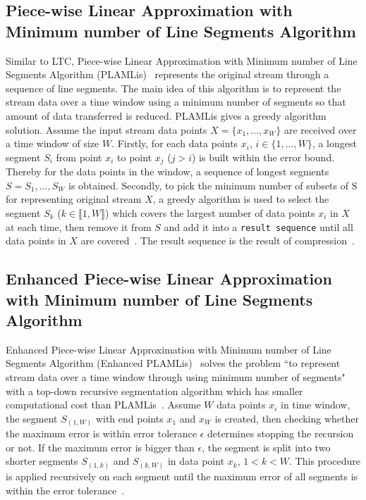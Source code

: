 \subsection{Piece-wise Linear Approximation
with Minimum number of Line Segments Algorithm}


Similar to LTC, Piece-wise Linear Approximation with Minimum number of Line
Segments Algorithm (PLAMLis)~\cite{liu2007energy} represents the original stream
through a sequence of line segments. The main idea of this algorithm is to
represent the stream data over a time window using a minimum number of segments
so that amount of data transferred is reduced. PLAMLis gives a greedy algorithm
solution. Assume the input stream data points $X=\{x_1, ..., x_W\}$ are received
over a time window of size $W$. Firstly, for each data points $x_i$, $i \in 
\{1, ..., W\}$, a longest segment $S_{i}$ from point $x_i$ to point $x_j$
($j>i$) is built within the error bound. Thereby for the data points in the
window, a sequence of longest segments $S = {S_1, ..., S_W}$ is obtained.
Secondly, to pick the minimum number of subsets of S for representing original
stream $X$, a greedy algorithm is used to select the segment $S_k$ ($k \in
\llbracket1, W\rrbracket$) which covers the largest number of data points $x_i$
in $X$ at each time, then remove it from $S$ and add it into a \texttt{result
sequence} until all data points in $X$ are covered~\cite{liu2007energy}. The
result sequence is the result of compression~\cite{zordan2012compress,
zordan2014performance}.


\subsection{Enhanced Piece-wise Linear Approximation with Minimum number of Line
Segments Algorithm} 

Enhanced Piece-wise Linear Approximation with Minimum number of Line Segments
Algorithm (Enhanced PLAMLis)~\cite{pham2008enhance} solves the problem ``to
represent stream data over a time window through using minimum number of
segments" with a top-down recursive segmentation algorithm which has smaller
computational cost than PLAMLis~\cite{pham2008enhance, zordan2014performance}.
Assume $W$ data points $x_i$ in time window, the segment $S_{(1, W)}$ with end
points $x_1$ and $x_W$ is created, then checking whether the maximum error is
within error tolerance $\epsilon$ determines stopping the recursion or not. If
the maximum error is bigger than $\epsilon$, the segment is split into two
shorter segments $S_{(1, k)}$ and $S_{(k, W)}$ in data point $x_k$, $1<k<W$.
This procedure is applied recursively on each segment until the maximum error of
all segments is within the error tolerance~\cite{pham2008enhance,
zordan2014performance}.

